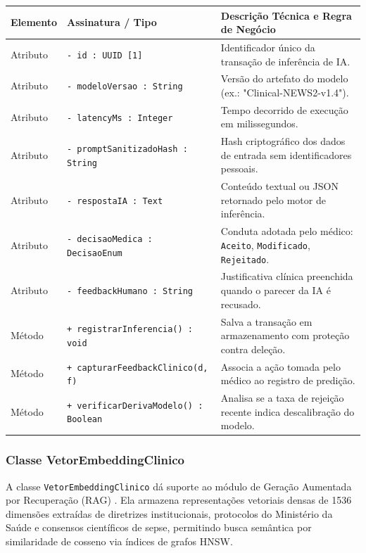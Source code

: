 \begingroup
\small
\noindent\begin{tabularx}{\linewidth}{l >{\raggedright\arraybackslash}p{5.7cm} >{\raggedright\arraybackslash}X}
\toprule
\textbf{Elemento} & \textbf{Assinatura / Tipo} & \textbf{Descrição Técnica e Regra de Negócio} \\
\midrule
Atributo & \texttt{- id : UUID [1]} & Identificador único da transação de inferência de IA. \\
Atributo & \texttt{- modeloVersao : String} & Versão do artefato do modelo (ex.: "Clinical-NEWS2-v1.4"). \\
Atributo & \texttt{- latencyMs : Integer} & Tempo decorrido de execução em milissegundos. \\
Atributo & \texttt{- promptSanitizadoHash : String} & Hash criptográfico dos dados de entrada sem identificadores pessoais. \\
Atributo & \texttt{- respostaIA : Text} & Conteúdo textual ou JSON retornado pelo motor de inferência. \\
Atributo & \texttt{- decisaoMedica : DecisaoEnum} & Conduta adotada pelo médico: \texttt{Aceito}, \texttt{Modificado}, \texttt{Rejeitado}. \\
Atributo & \texttt{- feedbackHumano : String} & Justificativa clínica preenchida quando o parecer da IA é recusado. \\
\midrule
Método & \texttt{+ registrarInferencia() : void} & Salva a transação em armazenamento com proteção contra deleção. \\
Método & \texttt{+ capturarFeedbackClinico(d, f)} & Associa a ação tomada pelo médico ao registro de predição. \\
Método & \texttt{+ verificarDerivaModelo() : Boolean} & Analisa se a taxa de rejeição recente indica descalibração do modelo. \\
\bottomrule
\end{tabularx}
\endgroup

\subsubsection{Classe VetorEmbeddingClinico}
A classe \texttt{VetorEmbeddingClinico} dá suporte ao módulo de Geração Aumentada por Recuperação (RAG) \cite{lewis_rag:2020}. Ela armazena representações vetoriais densas de 1536 dimensões extraídas de diretrizes institucionais, protocolos do Ministério da Saúde e consensos científicos de sepse, permitindo busca semântica por similaridade de cosseno via índices de grafos HNSW.

